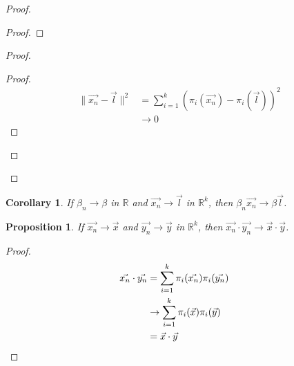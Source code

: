 \documentclass{book}
\let\qed\relax
\newtheorem{prop}{Proposition}[chapter]
\newtheorem{cor}{Corollary}[prop]
\theoremstyle{definition}
\begin{document}
\begin{proof}
\pf
{}
\begin{proof}
\end{proof}
\begin{proof}
	\begin{proof}
		\pf
		\begin{align*}
			\| \vec{x_n} - \vec{l} \|^2
			& = \sum_{i=1}^k (\pi_i(\vec{x_n}) - \pi_i(\vec{l}))^2 \\
			& \rightarrow 0
		\end{align*}
	\end{proof}
\end{proof}
\qed
\end{proof}

\begin{cor}
If $\beta_n \rightarrow \beta$ in $\mathbb{R}$ and $\vec{x_n} \rightarrow \vec{l}$ in $\mathbb{R}^k$, then $\beta_n \vec{x_n} \rightarrow \beta \vec{l}$.
\end{cor}

\begin{prop}
\label{prop:limit_of_inner_product}
If $\vec{x_n} \rightarrow \vec{x}$ and $\vec{y_n} \rightarrow \vec{y}$ in $\mathbb{R}^k$, then $\vec{x_n} \cdot \vec{y_n} \rightarrow \vec{x} \cdot \vec{y}$.
\end{prop}

\begin{proof}
\pf
\begin{align*}
\vec{x_n} \cdot \vec{y_n}
& = \sum_{i=1}^k \pi_i(\vec{x_n}) \pi_i(\vec{y_n}) \\
& \rightarrow \sum_{i=1}^k \pi_i(\vec{x}) \pi_i(\vec{y}) \\
& = \vec{x} \cdot \vec{y} & \qed
\end{align*}
\end{proof}
\end{document}
